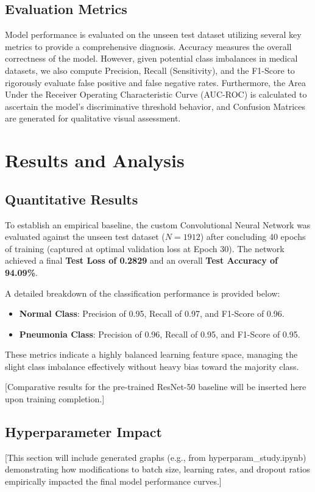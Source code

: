 \documentclass[conference]{IEEEtran}
\begin{document}
\subsection{Evaluation Metrics}
Model performance is evaluated on the unseen test dataset utilizing several key metrics to provide a comprehensive diagnosis. Accuracy measures the overall correctness of the model. However, given potential class imbalances in medical datasets, we also compute Precision, Recall (Sensitivity), and the F1-Score to rigorously evaluate false positive and false negative rates. Furthermore, the Area Under the Receiver Operating Characteristic Curve (AUC-ROC) is calculated to ascertain the model's discriminative threshold behavior, and Confusion Matrices are generated for qualitative visual assessment.

\section{Results and Analysis}

\subsection{Quantitative Results}
To establish an empirical baseline, the custom Convolutional Neural Network was evaluated against the unseen test dataset ($N=1912$) after concluding 40 epochs of training (captured at optimal validation loss at Epoch 30). The network achieved a final \textbf{Test Loss of 0.2829} and an overall \textbf{Test Accuracy of 94.09\%}.

A detailed breakdown of the classification performance is provided below:
\begin{itemize}
    \item \textbf{Normal Class}: Precision of 0.95, Recall of 0.97, and F1-Score of 0.96.
    \item \textbf{Pneumonia Class}: Precision of 0.96, Recall of 0.95, and F1-Score of 0.95.
\end{itemize}
These metrics indicate a highly balanced learning feature space, managing the slight class imbalance effectively without heavy bias toward the majority class.

[Comparative results for the pre-trained ResNet-50 baseline will be inserted here upon training completion.]

\subsection{Hyperparameter Impact}
[This section will include generated graphs (e.g., from hyperparam\_study.ipynb) demonstrating how modifications to batch size, learning rates, and dropout ratios empirically impacted the final model performance curves.]
\end{document}

